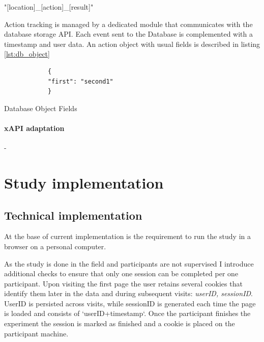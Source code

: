 		"[location]\_[action]\_[result]"
		
		
		Action tracking is managed by a dedicated module that communicates with the database storage API. Each event sent to the Database is complemented with a timestamp and user data. An action object with usual fields is described in listing \ref{lst:db_object}


	\begin{listing}[h]
		\begin{verbatim}
			{
			"first": "second1"
			}
		\end{verbatim}
		\caption{Database Object Fields}
		\label{lst:db_object}
	\end{listing}


		
		\paragraph{xAPI adaptation} - 
		

\section{Study implementation}



\subsection{Technical implementation} \label{sec:study_technical_implementation}
At the base of current implementation is the requirement to run the study in a browser on a personal computer. 

As the study is done in the field and participants are not supervised I introduce additional checks to ensure that only one session can be completed per one participant. Upon visiting the first page the user retains several cookies that identify them later in the data and during subsequent visits: \textit{userID, sessionID}. UserID is persisted across visits, while sessionID is generated each time the page is loaded and consists of `userID+timestamp`. Once the participant finishes the experiment the session is marked as finished and a cookie is placed on the participant machine.

